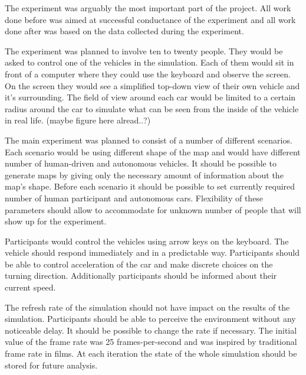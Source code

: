 \documentclass[11pt,english]{article}
\begin{document}
The experiment was arguably the most important part of the project. All work done before was aimed at successful conductance of the experiment and all work done after was based on the data collected during the experiment. 



\par

The experiment was planned to involve ten to twenty people. They would be asked to control one of the vehicles in the simulation. Each of them would sit in front of a computer where they could use the keyboard and observe the screen. On the screen they would see a simplified top-down view of their own vehicle and it's surrounding. The field of view around each car would be limited to a certain radius around the car to simulate what can be seen from the inside of the vehicle in real life. (maybe figure here alread..?)

\par

The main experiment was planned to consist of a number of different scenarios. Each scenario would be using different shape of the map and would have different number of human-driven and autonomous vehicles. It should be possible to generate maps by giving only the necessary amount of information about the map's shape. Before each scenario it should be possible to set currently required number of human participant and autonomous cars. Flexibility of these parameters should allow to accommodate for unknown number of people that will show up for the experiment.


\par


Participants would control the vehicles using arrow keys on the keyboard. The vehicle should respond immediately and in a predictable way. Participants should be able to control acceleration of the car and make discrete choices on the turning direction. Additionally participants should be informed about their current speed.  
\par

The refresh rate of the simulation should not have impact on the results of the simulation. Participants should be able to perceive the environment without any noticeable delay. It should be possible to change the rate if necessary. The initial value of the frame rate was 25 frames-per-second and was inspired by traditional frame rate in films. 
At each iteration the state of the whole simulation should be stored for future analysis. 
\end{document}
